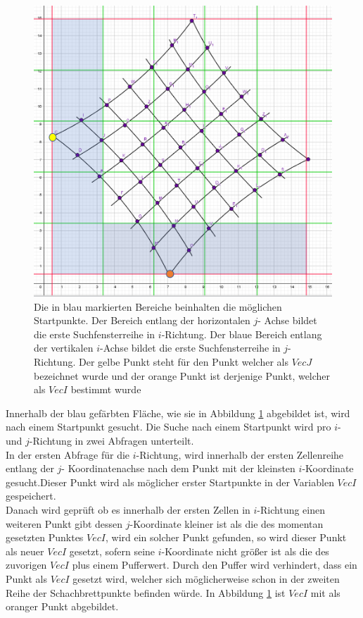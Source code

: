 \begin{figure}[!htb]
	\centering
	\includegraphics[width=0.6\linewidth]{images/VerzeichnetesSchachbrett_1.png}
	\caption[Startpunktsuche in Schachbrettpunkten]{Die in blau markierten Bereiche beinhalten die möglichen Startpunkte. Der Bereich entlang der horizontalen $j$- Achse bildet die erste Suchfensterreihe in $i$-Richtung. Der blaue Bereich entlang der vertikalen $i$-Achse bildet die erste Suchfensterreihe in $j$-Richtung. Der gelbe Punkt steht für den Punkt welcher als $VecJ$ bezeichnet wurde und der orange Punkt ist derjenige Punkt, welcher als $VecI$ bestimmt wurde}
	\label{fig:7.1}
\end{figure}

Innerhalb der blau gefärbten Fläche, wie sie in Abbildung \ref{fig:7.1} abgebildet ist, wird nach einem Startpunkt gesucht. Die Suche nach einem Startpunkt wird pro $i$- und $j$-Richtung in zwei Abfragen unterteilt.\\


In der ersten Abfrage für die $i$-Richtung, wird innerhalb der ersten Zellenreihe entlang der $j$- Koordinatenachse nach dem Punkt mit der kleinsten $i$-Koordinate gesucht.Dieser Punkt wird als möglicher erster Startpunkte in der Variablen $VecI$ gespeichert.\\


Danach wird geprüft ob es innerhalb der ersten Zellen in $i$-Richtung einen weiteren Punkt gibt dessen $j$-Koordinate kleiner ist als die des momentan gesetzten Punktes $VecI$, wird ein solcher Punkt gefunden, so wird dieser Punkt als neuer $VecI$ gesetzt, sofern seine $i$-Koordinate nicht größer ist als die des zuvorigen $VecI$ plus einem Pufferwert. Durch den Puffer wird verhindert, dass ein Punkt als $VecI$ gesetzt wird, welcher sich möglicherweise schon in der zweiten Reihe der Schachbrettpunkte befinden würde. In Abbildung \ref{fig:7.1} ist $VecI$ mit als oranger Punkt abgebildet.\\

